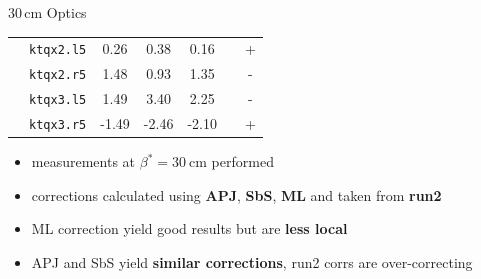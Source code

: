 \documentclass[4pt,usenames,dvipsnames,aspectratio=169,table]{beamer}
\newcommand{\highl}[1]{\textbf{#1}}
\begin{document}
\begin{frame}{30\,cm Optics}
\begin{center}
{{\begin{tabular}{l|lSSSS|c|}
         & \texttt{ktqx2.l5} & \color{RunTwored} 0.26 & \color{APJgreen} 0.38 & \color{SbSorange} 0.16 & \text{-} & + \\
         & \texttt{ktqx2.r5} & \color{RunTwored} 1.48 & \color{APJgreen} 0.93 & \color{SbSorange} 1.35 & \text{-} & - \\
         & \texttt{ktqx3.l5} & \color{RunTwored} 1.49 & \color{APJgreen} 3.40 & \color{SbSorange} 2.25 & \text{-} & - \\
         & \texttt{ktqx3.r5} & \color{RunTwored}-1.49 & \color{APJgreen}-2.46 & \color{SbSorange}-2.10 & \text{-} & + \\\hline \midrule
        \end{tabular} 
        }
        }
    \end{center}
    \begin{itemize}
        \item measurements at $\beta^*=\SI{30}{\centi\meter}$ performed
        \item corrections calculated using \highl{APJ}, \highl{SbS}, \highl{ML} and taken from \highl{run2}
        \item ML correction yield good results but are \highl{less local}
        \item APJ and SbS yield \highl{similar corrections},
            run2 corrs are over-correcting
    \end{itemize}
\end{frame}
\end{document}
